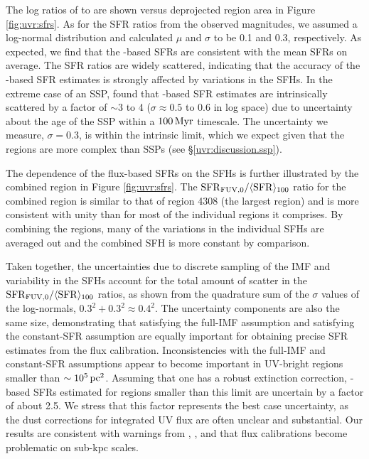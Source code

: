 The log ratios of \sfrfuvz{} to \sfroneh{}
are shown versus deprojected region area in Figure \ref{fig:uvr:sfrs}. As for the
SFR ratios from the observed \fuv{} magnitudes, we assumed a log-normal
distribution and calculated $\mu$ and $\sigma$ to be 0.1 and 0.3, respectively.
As expected, we find that the \fuv{}-based SFRs are consistent with the mean SFRs
on average. The SFR ratios are widely scattered, indicating that the accuracy
of the \fuv{}-based SFR estimates is strongly affected by variations in the SFHs.
In the extreme case of an SSP, \citet{Leroy:2012} found that \fuv{}-based SFR
estimates are intrinsically scattered by a factor of $\sim 3$ to 4 ($\sigma
\approx 0.5$ to 0.6 in log space) due to uncertainty about the age of the SSP
within a $100\,\mathrm{Myr}$ timescale. The uncertainty we measure,
$\sigma=0.3$, is within the intrinsic limit, which we expect given that the
regions are more complex than SSPs (see \S \ref{uvr:discussion.ssp}).

The dependence of the flux-based SFRs on the SFHs is further illustrated by the
combined region in Figure \ref{fig:uvr:sfrs}. The
$\mathrm{SFR}_{\mathrm{FUV},0} / \langle\mathrm{SFR}\rangle_{100}$ ratio for the combined
region is similar to that of region 4308 (the largest region) and is more
consistent with unity than for most of the individual regions it comprises. By
combining the regions, many of the variations in the individual SFHs are
averaged out and the combined SFH is more constant by comparison.

Taken together, the uncertainties due to discrete sampling of the IMF and
variability in the SFHs account for the total amount of scatter in the
$\mathrm{SFR}_{\mathrm{FUV},0} / \langle\mathrm{SFR}\rangle_{100}$ ratios, as shown from the
quadrature sum of the $\sigma$ values of the log-normals, $0.3^2 + 0.3^2
\approx 0.4^2$. The uncertainty components are also the same size,
demonstrating that satisfying the full-IMF assumption and satisfying the
constant-SFR assumption are equally important for obtaining precise SFR
estimates from the \fuv{} flux calibration. Inconsistencies with the full-IMF and
constant-SFR assumptions appear to become important in UV-bright regions
smaller than $\sim 10^5\,\mathrm{pc}^2$. Assuming that one has a robust \fuv{}
extinction correction, \fuv{}-based SFRs estimated for regions smaller than this
limit are uncertain by a factor of about 2.5. We stress that this factor
represents the best case uncertainty, as the dust corrections for integrated UV
flux are often unclear and substantial. Our results are consistent with
warnings from \citet{Murphy:2011}, \citet{Kennicutt:2012}, and \citet{Leroy:2012} that
flux calibrations become problematic on sub-kpc scales.

